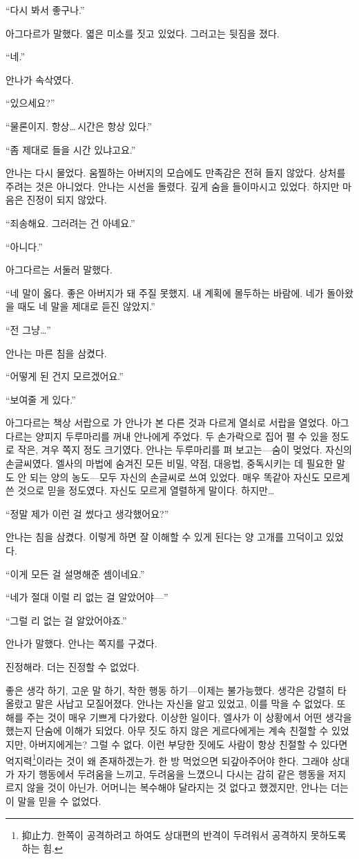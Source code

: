 ``다시 봐서 좋구나.''

아그다르가 말했다. 엷은 미소를 짓고 있었다. 그러고는 뒷짐을 졌다.

``네.''

안나가 속삭였다.

`` 있으세요?''

``물론이지. 항상\ldots\,시간은 항상 있다.''

``좀 제대로 들을 시간 있냐고요.''

안나는 다시 물었다. 움찔하는 아버지의 모습에도 만족감은 전혀 들지 않았다. 상처를 주려는 것은 아니었다. 안나는 시선을 돌렸다. 깊게 숨을 들이마시고 있었다. 하지만 마음은 진정이 되지 않았다.

``죄송해요. 그러려는 건 아녜요.''

``아니다.''

아그다르는 서둘러 말했다.

``네 말이 옳다. 좋은 아버지가 돼 주질 못했지. 내 계획에 몰두하는 바람에. 네가 돌아왔을 때도 네 말을 제대로 듣진 않았지.''

``전 그냥\ldots''

안나는 마른 침을 삼켰다.

``어떻게 된 건지 모르겠어요.''

``보여줄 게 있다.''

아그다르는 책상 서랍으로 가 안나가 본 다른 것과 다르게 열쇠로 서랍을 열었다. 아그다르는 양피지 두루마리를 꺼내 안나에게 주었다. 두 손가락으로 집어 펼 수 있을 정도로 작은, 겨우 쪽지 정도 크기였다. 안나는 두루마리를 펴 보고는—숨이 멎었다. 자신의 손글씨였다. 엘사의 마법에 숨겨진 모든 비밀, 약점, 대응법, 중독시키는 데 필요한 말도 안 되는 양의 농도—모두 자신의 손글씨로 쓰여 있었다. 매우 똑같아 자신도 모르게 쓴 것으로 믿을 정도였다. 자신도 모르게 열렬하게 말이다. 하지만\ldots

``정말 제가 이런 걸 썼다고 생각했어요?''

안나는 침을 삼켰다. 이렇게 하면 잘 이해할 수 있게 된다는 양 고개를 끄덕이고 있었다.

``이게 모든 걸 설명해준 셈이네요.''

``네가 절대 이럴 리 없는 걸 알았어야—''

``그럴 리 없는 걸 알았어야죠.''

안나가 말했다. 안나는 쪽지를 구겼다.

진정해라. 더는 진정할 수 없었다.

좋은 생각 하기, 고운 말 하기, 착한 행동 하기—이제는 불가능했다. 생각은 강렬히 타올랐고 말은 사납고 모질어졌다. 안나는 자신을 알고 있었고, 이를 막을 수 없었다. 또 해를 주는 것이 매우 기쁘게 다가왔다. 이상한 일이다, 엘사가 이 상황에서 어떤 생각을 했는지 단숨에 이해가 되었다. 아무 짓도 하지 않은 게르다에게는 계속 친절할 수 있었지만, 아버지에게는? 그럴 수 없다. 이런 부당한 짓에도 사람이 항상 친절할 수 있다면 억지력\footnote{抑止力. 한쪽이 공격하려고 하여도 상대편의 반격이 두려워서 공격하지 못하도록 하는 힘.}이라는 것이 왜 존재하겠는가. 한 방 먹었으면 되갚아주어야 한다. 그래야 상대가 자기 행동에서 두려움을 느끼고, 두려움을 느꼈으니 다시는 감히 같은 행동을 저지르지 않을 것이 아닌가. 어머니는 복수해야 달라지는 것 없다고 했겠지만, 안나는 더는 이 말을 믿을 수 없었다.

